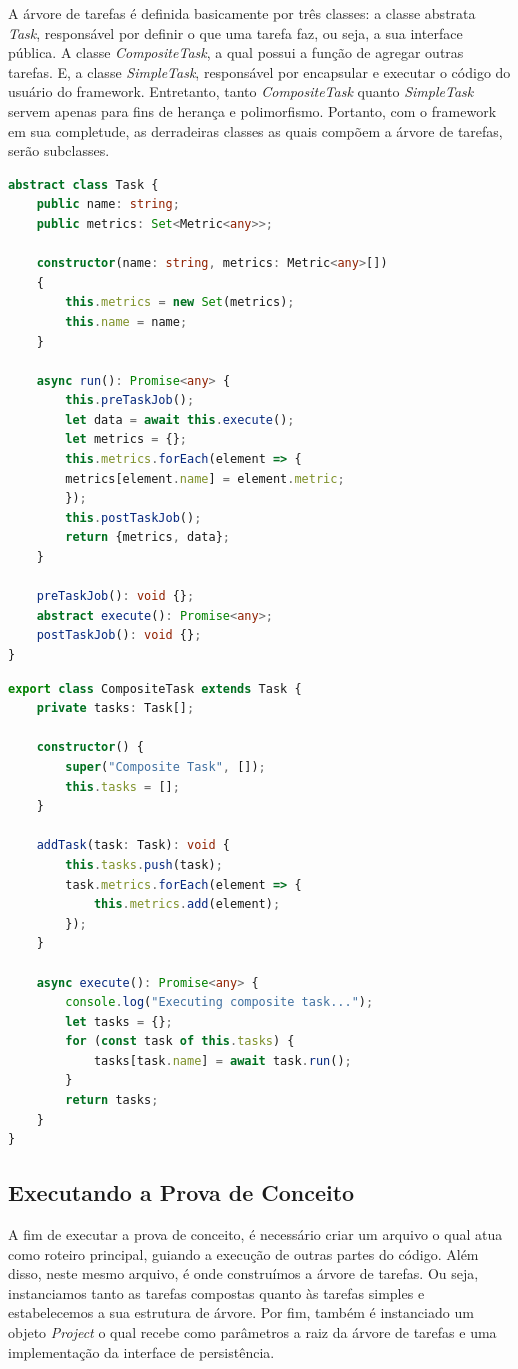 \documentclass[12pt]{tcc}
\begin{document}
A árvore de tarefas é definida basicamente por três classes:
a classe abstrata \emph{Task}, responsável por definir o que uma tarefa faz, ou seja, a sua interface pública.
A classe \emph{CompositeTask}, a qual possui a função de agregar outras tarefas.
E, a classe \emph{SimpleTask}, responsável por encapsular e executar o código do usuário do framework.
Entretanto, tanto \emph{CompositeTask} quanto \emph{SimpleTask} servem apenas para fins de herança e polimorfismo.
Portanto, com o framework em sua completude, as derradeiras classes as quais compõem a árvore de tarefas, serão subclasses.

\begin{lstlisting}[label={lst:abstract_task}, caption={Classe abstrata responsável por definir o que todos os membros da árvore de tarefas precisam implementar.}, language=TypeScript]
abstract class Task {
	public name: string;
	public metrics: Set<Metric<any>>;

	constructor(name: string, metrics: Metric<any>[])
	{
		this.metrics = new Set(metrics);
		this.name = name;
	}

	async run(): Promise<any> {
		this.preTaskJob();
		let data = await this.execute();
		let metrics = {};
		this.metrics.forEach(element => {
		metrics[element.name] = element.metric;
		});
		this.postTaskJob();
		return {metrics, data};
	}

	preTaskJob(): void {};
	abstract execute(): Promise<any>;
	postTaskJob(): void {};
}
\end{lstlisting}

\begin{lstlisting}[label={lst:composite_task}, caption={Tarefa composta, define o comportamento de todos os nós não folha da árvore de tarefas.}, language=TypeScript]
export class CompositeTask extends Task {
	private tasks: Task[];

	constructor() {
		super("Composite Task", []);
		this.tasks = [];
	}

	addTask(task: Task): void {
		this.tasks.push(task);
		task.metrics.forEach(element => {
			this.metrics.add(element);
		});
	}

	async execute(): Promise<any> {
		console.log("Executing composite task...");
		let tasks = {};
		for (const task of this.tasks) {
			tasks[task.name] = await task.run();
		}
		return tasks;
	}
}
\end{lstlisting}


\subsection{Executando a Prova de Conceito}
\label{sec:exe_poc}
A fim de executar a prova de conceito, é necessário criar um arquivo o qual atua como roteiro principal, guiando a execução de outras partes do código.
Além disso, neste mesmo arquivo, é onde construímos a árvore de tarefas.
Ou seja, instanciamos tanto as tarefas compostas quanto às tarefas simples e estabelecemos a sua estrutura de árvore.
Por fim, também é instanciado um objeto \emph{Project} o qual recebe como parâmetros a raiz da árvore de tarefas e uma implementação da interface de persistência.
\end{document}
